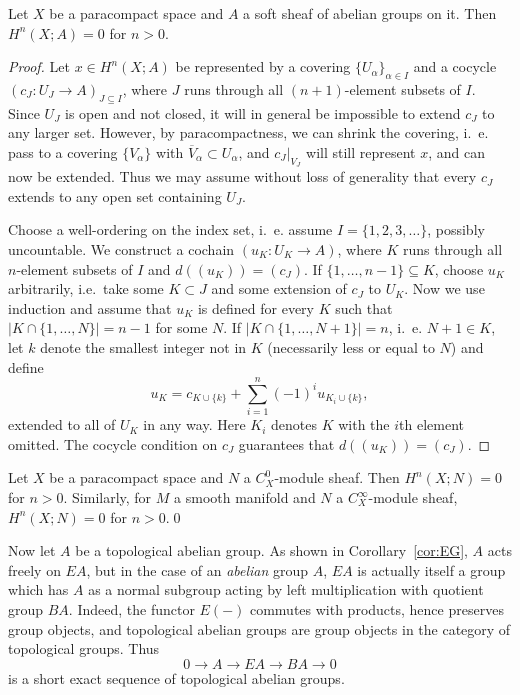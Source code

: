 \documentclass[a4paper,openany]{scrbook}
\begin{document}
\begin{prop}\label{prop:finesheafcohomology}
Let $X$ be a paracompact space and $A$ a soft sheaf of abelian groups on it. Then $H^n(X;A)=0$ for $n>0$.
\end{prop}
\begin{proof}
Let $x \in H^n(X;A)$ be represented by a covering $\{U_\alpha\}_{\alpha \in I}$ and a cocycle $(c_J\colon U_J \to A)_{J \subseteq I}$, where $J$ runs through all $(n+1)$-element subsets of $I$. Since $U_J$ is open and not closed, it will in general be impossible to extend $c_J$ to any larger set. However, by paracompactness, we can shrink the covering, i.~e. pass to a covering $\{V_\alpha\}$ with $\overline V_\alpha \subset U_\alpha$, and $c_J|_{V_J}$ will still represent $x$, and can now be extended. Thus we may assume without loss of generality that every $c_J$ extends to any open set containing $U_J$.

Choose a well-ordering on the index set, i.~e. assume $I=\{1,2,3,\dots\}$, possibly uncountable. We construct a cochain $(u_K\colon U_K \to A)$, where $K$ runs through all $n$-element subsets of $I$ and $d((u_K)) = (c_J)$. If $\{1,\dots,n-1\} \subseteq K$, choose $u_K$ arbitrarily, i.e.\ take some $K \subset J$ and some extension of $c_J$ to $U_K$. Now we use induction and assume that $u_K$ is defined for every $K$ such that $|K \cap \{1,\dots,N\}| = n-1$ for some $N$. If $|K \cap \{1,\dots,N+1\}| = n$, i.~e. $N+1 \in K$, let $k$ denote the smallest integer not in $K$ (necessarily less or equal to $N$) and define
\[
u_K = c_{K\cup\{k\}}+\sum_{i=1}^{n} (-1)^i u_{K_i \cup \{k\}},
\]
extended to all of $U_K$ in any way. Here $K_i$ denotes $K$ with the $i$th element omitted. The cocycle condition on $c_J$ guarantees that $d((u_K))=(c_J)$.
\end{proof}

\begin{corollary}\label{cor:Omodulecohomology}
Let $X$ be a paracompact space and $N$ a $C^0_X$-module sheaf. Then $H^n(X;N)=0$ for $n>0$. Similarly, for $M$ a smooth manifold and $N$ a $C^\infty_X$-module sheaf, $H^n(X;N)=0$ for $n>0$.\qed
\end{corollary}

Now let $A$ be a topological abelian group. As shown in Corollary~\ref{cor:EG}, $A$ acts freely on $EA$, but in the case of an \emph{abelian} group $A$, $EA$ is actually itself a group which has $A$ as a normal subgroup acting by left multiplication with quotient group $BA$. Indeed, the functor $E(-)$ commutes with products, hence preserves group objects, and topological abelian groups are group objects in the category of topological groups. Thus
\[
0 \to A \to EA \to BA \to 0
\]
is a short exact sequence of topological abelian groups.
\end{document}
